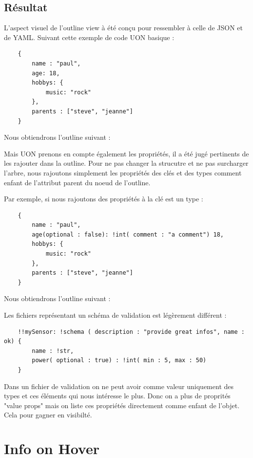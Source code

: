 \documentclass[
    iict, %
    il, %
]{heig-tb}
\begin{document}
\subsection{Résultat}
L'aspect visuel de l'outline view à été conçu pour ressembler à celle de JSON et de YAML.
Suivant cette exemple de code UON basique :

\begin{lstlisting}
    {
        name : "paul",
        age: 18,
        hobbys: {
            music: "rock"
        },
        parents : ["steve", "jeanne"]
    }
\end{lstlisting}

Nous obtiendrons l'outline suivant :


Mais UON prenons en compte également les propriétés, il a été jugé pertinents de les rajouter dans la outline.
Pour ne pas changer la strucutre et ne pas surcharger l'arbre,
nous rajoutons simplement les propriétés des clés et des types comment enfant de l'attribut parent du noeud de l'outline.

Par exemple, si nous rajoutons des propriétés à la clé est un type :
\begin{lstlisting}
    {
        name : "paul",
        age(optional : false): !int( comment : "a comment") 18,
        hobbys: {
            music: "rock"
        },
        parents : ["steve", "jeanne"]
    }
\end{lstlisting}

Nous obtiendrons l'outline suivant :


Les fichiers représentant un schéma de validation est légèrement différent :

\begin{lstlisting}
    !!mySensor: !schema ( description : "provide great infos", name : ok) {
        name : !str,
        power( optional : true) : !int( min : 5, max : 50)
    }
\end{lstlisting}


Dans un fichier de validation on ne peut avoir comme valeur uniquement des types et ces éléments qui nous intéresse le plus.
Donc on a plus de proprités "value props" mais on liste ces propriétés directement comme enfant de l'objet. Cela pour gagner en visibilté.




\section{Info on Hover}
\end{document}

